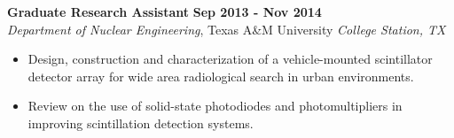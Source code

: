 \textbf{Graduate Research Assistant} \hfill \textbf{Sep 2013 - Nov 2014} \\
\textsl{Department of Nuclear Engineering}, Texas A\&M University \hfill \textsl{College Station, TX} \\[-2.8ex]
\vspace{2pt}
\begin{itemize}[leftmargin=4ex] \itemsep -2pt
    \item Design, construction and characterization of a vehicle-mounted scintillator detector array for wide area radiological search in urban environments.
    \item Review on the use of solid-state photodiodes and photomultipliers in improving scintillation detection systems.
\end{itemize}

